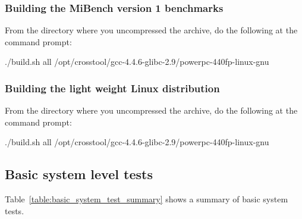 \subsubsection{Building the MiBench version 1 benchmarks}

From the directory where you uncompressed the archive, do the following at the command prompt:
\begin{script}
./build.sh all /opt/crosstool/gcc-4.4.6-glibc-2.9/powerpc-440fp-linux-gnu
\end{script}

\subsubsection{Building the light weight Linux distribution}

From the directory where you uncompressed the archive, do the following at the command prompt:
\begin{script}
./build.sh all /opt/crosstool/gcc-4.4.6-glibc-2.9/powerpc-440fp-linux-gnu
\end{script}

\subsection{Basic system level tests}

Table~\ref{table:basic_system_test_summary} shows a summary of basic system tests.


